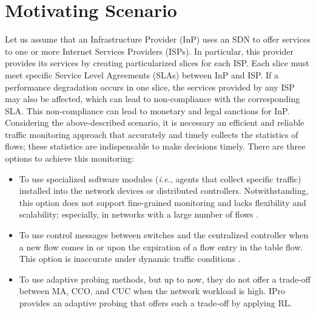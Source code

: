 \section{Motivating Scenario}
\label{sec:motivating_scenario}
Let us assume that an Infrastructure Provider (InP) uses an SDN to offer services to one or more Internet Services Providers (ISPs). In particular, this provider provides its services by creating particularized slices for each ISP. Each slice must meet specific Service Level Agreements (SLAs) between InP and ISP. If a performance degradation occurs in one slice, the services provided by any ISP may also be affected, which can lead to non-compliance with the corresponding SLA. This non-compliance can lead to monetary and legal sanctions for InP.\\

Considering the above-described scenario, it is necessary an efficient and reliable traffic monitoring approach that accurately and timely collects the statistics of flows; these statistics are indispensable to make decisions timely. There are three options to achieve this monitoring:
\begin{itemize}
    \item To use specialized software modules (\textit{i.e.}, agents that collect specific traffic) installed into the network devices or distributed controllers. Notwithstanding, this option does not support fine-grained monitoring and lacks flexibility and scalability; especially, in networks with a large number of flows \cite{jose_2011:online_measurement}.
    \item To use control messages between switches and the centralized controller when a new flow comes in or upon the expiration of a flow entry in the table flow. This option is inaccurate under dynamic traffic conditions \cite{megyesi_2017:challenges}.
    \item To use adaptive probing methods, but up to now, they do not offer a trade-off between MA, CCO, and CUC when the network workload is high. IPro provides an adaptive probing that offers such a trade-off by applying RL.
\end{itemize}{}